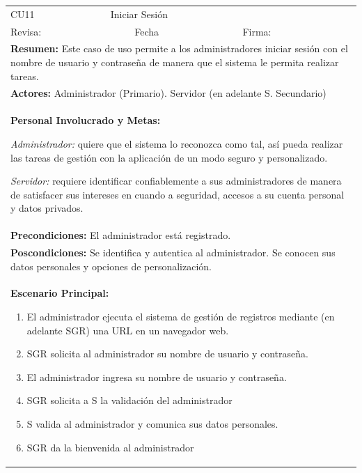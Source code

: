 			\begin{longtable}{|l|p{5.5cm}|l|p{2cm}|l|p{1.9cm}|} \hline
					\cellcolor{grisOscuro} CU11 & \multicolumn{4}{|l|}{  \cellcolor{grisOscuro} Iniciar Sesión} &  \cellcolor{grisClaro}\multirow{2}{1cm}{} \\ \cline{1-5}
					\cellcolor{grisOscuro} Revisa: &  \cellcolor{grisClaro} &  \cellcolor{grisOscuro} Fecha &  \cellcolor{grisClaro} &  \cellcolor{grisOscuro} Firma: & \cellcolor{grisClaro} \\ \hline
					\multicolumn{6}{|p{15cm}|}{ \textbf{Resumen: } Este caso de uso permite a los administradores iniciar sesión con el nombre de usuario y contraseña de manera que el sistema le permita realizar tareas.

					} \\ \hline

					\multicolumn{6}{|p{15cm}|}{ \textbf{Actores: } Administrador (Primario). Servidor (en adelante S. Secundario)

					} \\ \hline

					\multicolumn{6}{|p{15cm}|}{ \textbf{Personal Involucrado y Metas: }

					\emph{Administrador:} quiere que el sistema lo reconozca como tal, así pueda realizar las tareas de gestión con la aplicación de un modo seguro y personalizado.

					\emph{Servidor:} requiere identificar confiablemente a sus administradores de manera de satisfacer sus intereses en cuando a seguridad, accesos a su cuenta personal y datos privados.

					} \\ \hline

					\multicolumn{6}{|p{15cm}|}{ \textbf{Precondiciones: } El administrador está registrado.

					} \\ \hline

					\multicolumn{6}{|p{15cm}|}{ \textbf{Poscondiciones: } Se identifica y autentica al administrador. Se conocen sus datos personales y opciones de personalización.

					} \\ \hline

					\multicolumn{6}{|p{15cm}|}{ \textbf{Escenario Principal: }

					\begin{enumerate}
							\item El administrador ejecuta el sistema de gestión de registros mediante (en adelante SGR) una URL en un navegador web.
							\item SGR solicita al administrador su nombre de usuario y contraseña.
							\item El administrador ingresa su nombre de usuario y contraseña.
							\item SGR solicita a S la validación del administrador
							\item S valida al administrador y comunica sus datos personales.
							\item SGR da la bienvenida al administrador
					\end{enumerate}

}
\end{longtable}
